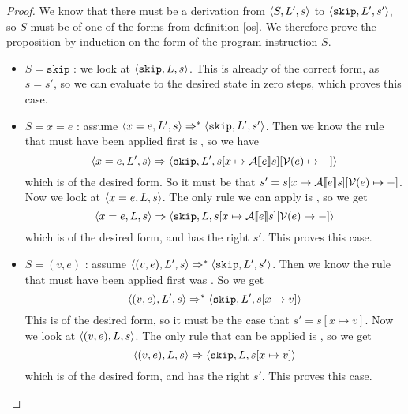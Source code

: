 \begin{proof}
We know that there must be a derivation from $\langle S, L', s \rangle$ to $\langle \texttt{skip}, L', s' \rangle$, so $S$ must be of one of the forms from definition \ref{os}. We therefore prove the proposition by induction on the form of the program instruction $S$.

\begin{itemize}[noitemsep]
    \item $S = \texttt{skip}$ : we look at $\langle \texttt{skip}, L, s \rangle$. This is already of the correct form, as $s=s'$, so we can evaluate to the desired state in zero steps, which proves this case. 
    
    \item $S = x =  e$ : assume $\langle x = e, L', s \rangle \Rightarrow ^{*} \langle \texttt{skip}, L', s' \rangle$. Then we know the rule that must have been applied first is \asssos, so we have 
    $$\langle x = e, L', s \rangle \Rightarrow \langle \texttt{skip}, L', s[x \mapsto \mathcal{A} \llbracket e \rrbracket s][\mathcal{V}(e)\mapsto-] \rangle$$
    which is of the desired form. So it must be that $s' = s[x \mapsto \mathcal{A} \llbracket e \rrbracket s][\mathcal{V}(e)\mapsto-]$. Now we look at $\langle x = e, L, s \rangle$. The only rule we can apply is \asssos, so we get 
    $$\langle x = e, L, s \rangle \Rightarrow \langle \texttt{skip}, L, s [x \mapsto \mathcal{A} \llbracket e \rrbracket s][\mathcal{V}(e)\mapsto-] \rangle$$
    which is of the desired form, and has the right $s'$. This proves this case. 
    
    \item $S = (v,e)$ : assume $\langle (v,e), L', s \rangle \Rightarrow ^{*} \langle \texttt{skip}, L', s' \rangle$. Then we know the rule that must have been applied first was \setsos. So we get
    $$\langle (v,e), L', s \rangle \Rightarrow ^{*} \langle \texttt{skip}, L', s[x\mapsto v] \rangle$$ 
    This is of the desired form, so it must be the case that $s' = s[x\mapsto v]$. Now we look at $\langle (v,e), L, s \rangle$. The only rule that can be applied is \setsos, so we get $$\langle (v,e), L, s \rangle \Rightarrow  \langle \texttt{skip}, L, s[x\mapsto v] \rangle$$
    which is of the desired form, and has the right $s'$. This proves this case.
    

\end{itemize}
\end{proof}
